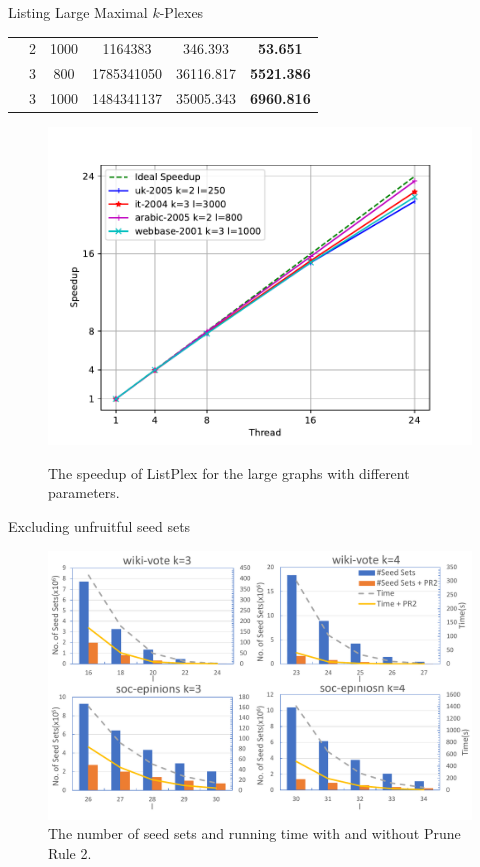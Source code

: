 \documentclass[9pt,notheorems]{beamer} %
\begin{document}
\begin{frame}{Listing Large Maximal $k$-Plexes}
\begin{minipage}{0.45\linewidth}
\begin{table}[H]
{\begin{tabular}{c|c|c|c|c|c}
            & 2 & 1000 & 1164383 & 346.393 & \textbf{53.651} \\
            \cline{2-6}
            & 3 & 800 & 1785341050 & 36116.817 &\textbf{5521.386} \\
            & 3 & 1000 & 1484341137 & 35005.343 & \textbf{6960.816} \\
            \bottomrule[2pt]
            \end{tabular}
            }
        \end{table}
    \end{minipage}\hspace{0.5cm}
    \begin{minipage}{0.45\linewidth}
        \begin{figure}[H]
            \centering
            \includegraphics[width=\linewidth]{pic/parallel.pdf}\\
            \caption{The speedup of ListPlex for the large graphs with different parameters. }
          \end{figure}
    \end{minipage}
\end{frame}
\begin{frame}{Excluding unfruitful seed sets}
    \begin{figure}[htb]
        \centering
        \includegraphics[width=0.8\linewidth]{pic/prune.pdf}
        \caption{The number of seed sets and running time with and without Prune Rule 2.}
      \end{figure} 
\end{frame}
\end{document}
